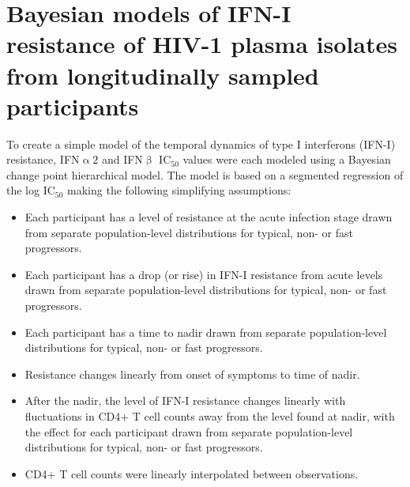 \documentclass[12pt]{article}
\newcommand{\ifna}{IFN\hspace{-.08em}${\upalpha 2}$}
\newcommand{\ifnb}{IFN\hspace{-.03em}${\upbeta}$}
\newcommand{\icFifty}{IC$_{50}$}
\begin{document}
\begin{center}
 \Large\textbf{}
\end{center}
\section*{Bayesian models of IFN-I resistance of HIV-1 plasma isolates from longitudinally sampled participants}
To create a simple model of the temporal dynamics of type I interferons (IFN-I) resistance, \ifna{} and \ifnb{} \icFifty{} values were each modeled using a Bayesian change point hierarchical model.
  The model is based on a segmented regression of the log \icFifty{} making the following simplifying assumptions:
    \begin{itemize}
          \item Each participant has a level of resistance at the acute infection stage drawn from separate population-level distributions for typical, non- or fast progressors.
          \item Each participant has a drop (or rise) in IFN-I resistance from acute levels drawn from separate population-level distributions for typical, non- or fast progressors.
          \item Each participant has a time to nadir drawn from separate population-level distributions for typical, non- or fast progressors.
          \item Resistance changes linearly from onset of symptoms to time of nadir.
          \item After the nadir, the level of IFN-I resistance changes linearly with fluctuations in CD4+ T cell counts away from the level found at nadir, with the effect for each participant drawn from separate population-level distributions for typical, non- or fast progressors.
          \item CD4+ T cell counts were linearly interpolated between observations.
    \end{itemize}
  
\end{document}
